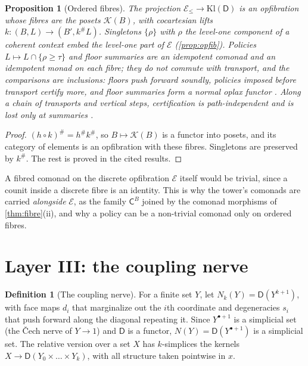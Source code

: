 \documentclass[11pt]{article}
\newtheorem{proposition}[theorem]{Proposition}
\theoremstyle{definition}
\newtheorem{definition}[theorem]{Definition}
\theoremstyle{remark}
\newcommand{\D}{\mathsf{D}}
\newcommand{\Kl}{\mathrm{Kl}}
\newcommand{\C}{\mathsf{C}}
\begin{document}
\begin{proposition}[Ordered fibres]\label{prop:ordered}
The projection $\mathcal E_{\le}\to\Kl(\D)$ is an opfibration whose fibres are the posets $\mathcal K(B)$, with cocartesian
lifts $k\colon(B,L)\to(B',k^\#L)$. Singletons $\{\rho\}$ with $\rho$ the level-one component of a coherent context embed the
level-one part of $\mathcal E$ (\cref{prop:opfib}). Policies $L\mapsto L\cap\{\rho\ge\tau\}$ and floor summaries are an
idempotent comonad and an idempotent monad on each fibre; they do not commute with transport, and the comparisons are
inclusions: floors push forward soundly, policies imposed before transport certify more, and floor summaries form a normal oplax
functor \cite[Prop.~10.23, Prop.~10.24]{Awasthi-Tower}. Along a chain of transports and vertical steps, certification is
path-independent and is lost only at summaries \cite[Thm.~10.26]{Awasthi-Tower}.
\end{proposition}
\begin{proof}
$(h\circ k)^\#=h^\#k^\#$, so $B\mapsto\mathcal K(B)$ is a functor into posets, and its category of elements is an opfibration
with these fibres. Singletons are preserved by $k^\#$. The rest is proved in the cited results.
\end{proof}

A fibred comonad on the discrete opfibration $\mathcal E$ itself would be trivial, since a counit inside a discrete fibre is an
identity. This is why the tower's comonads are carried \emph{alongside} $\mathcal E$, as the family $\C^B$ joined by the comonad
morphisms of \cref{thm:fibre}(ii), and why a policy can be a non-trivial comonad only on ordered fibres.

\section{Layer III: the coupling nerve}\label{sec:nerve}

\begin{definition}[The coupling nerve]\label{def:nerve}
For a finite set $Y$, let $N_k(Y)=\D(Y^{k+1})$, with face maps $d_i$ that marginalize out the $i$th coordinate and
degeneracies $s_i$ that push forward along the diagonal repeating it. Since $Y^{\bullet+1}$ is a simplicial set (the
Čech nerve of $Y\to1$) and $\D$ is a functor, $N(Y)=\D(Y^{\bullet+1})$ is a simplicial set. The relative version over a
set $X$ has $k$-simplices the kernels $X\to\D(Y_0\times\dots\times Y_k)$, with all structure taken pointwise in $x$.
\end{definition}
\end{document}
